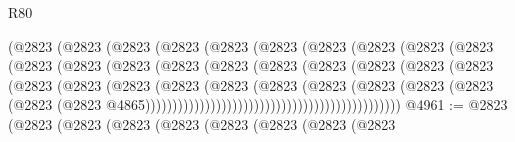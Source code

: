 \begin{lexlean}{R80}
\begin{coremodule}
                                  (@2823
                                    (@2823
                                      (@2823
                                        (@2823
                                          (@2823
                                            (@2823
                                              (@2823
                                                (@2823
                                                  (@2823
                                                    (@2823
                                                      (@2823
                                                        (@2823
                                                          (@2823
                                                            (@2823
                                                              (@2823
                                                                (@2823
                                                                  (@2823
                                                                    (@2823
                                                                      (@2823
                                                                        (@2823
                                                                          (@2823
                                                                            (@2823
                                                                              (@2823
                                                                                (@2823
                                                                                  (@2823
                                                                                    (@2823
                                                                                      (@2823
                                                                                        (@2823
                                                                                          (@2823
                                                                                            (@2823
                                                                                              (@2823
                                                                                                (@2823
                                                                                                  @4865)))))))))))))))))))))))))))))))))))))))))))))))
@4961 := @2823
    (@2823
      (@2823
        (@2823
          (@2823
            (@2823
              (@2823
                (@2823
                  (@2823

\end{coremodule}
\end{lexlean}
